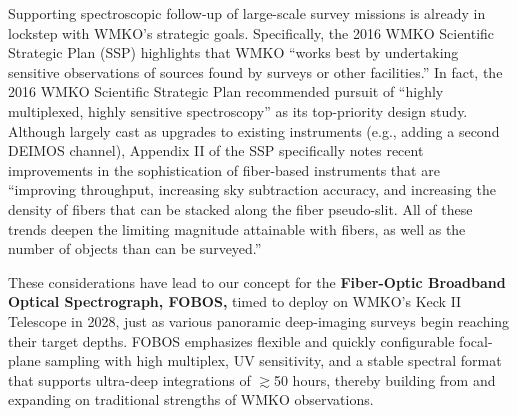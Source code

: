\documentclass[11pt,a4paper,twoside,onecolumn,openany,final,oldfontcommands]{memoir}
\begin{document}
Supporting spectroscopic follow-up of large-scale survey missions is already in lockstep with WMKO's strategic goals.  Specifically, the 2016 WMKO Scientific Strategic Plan (SSP) highlights that WMKO ``works best by undertaking sensitive observations of sources found by surveys or other facilities.''  In fact, the 2016 WMKO Scientific Strategic Plan recommended pursuit of ``highly multiplexed, highly sensitive spectroscopy'' as its top-priority design study.  Although largely cast as upgrades to existing instruments (e.g., adding a second DEIMOS channel), Appendix II of the SSP specifically notes recent improvements in the sophistication of fiber-based instruments that are ``improving throughput, increasing sky subtraction accuracy, and increasing the density of fibers that can be stacked along the fiber pseudo-slit. All of these trends deepen the limiting magnitude attainable with fibers, as well as the number of objects than can be surveyed.''

These considerations have lead to our concept for the \textbf{Fiber-Optic Broadband Optical Spectrograph, FOBOS,} timed to deploy on WMKO's Keck II Telescope in 2028, just as various panoramic deep-imaging surveys begin reaching their target depths.  FOBOS emphasizes flexible and quickly configurable focal-plane sampling with high multiplex, UV sensitivity, and a stable spectral format that supports ultra-deep integrations of $\gtrsim$50 hours, thereby building from and expanding on traditional strengths of WMKO observations.



\end{document}
